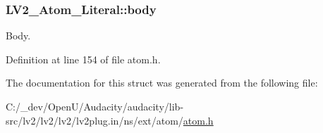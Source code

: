 \subsubsection[{\texorpdfstring{body}{body}}]{ L\+V2\+\_\+\+Atom\+\_\+\+Literal\+::body}\hypertarget{struct_l_v2___atom___literal_aee17071e3ad4d2ae5918573cbcb0dbea}{}\label{struct_l_v2___atom___literal_aee17071e3ad4d2ae5918573cbcb0dbea}
Body. 

Definition at line 154 of file atom.\+h.



The documentation for this struct was generated from the following file\+:\begin{DoxyCompactItemize}
\item 
C\+:/\+\_\+dev/\+Open\+U/\+Audacity/audacity/lib-\/src/lv2/lv2/lv2/lv2plug.\+in/ns/ext/atom/\hyperlink{atom_8h}{atom.\+h}\end{DoxyCompactItemize}
